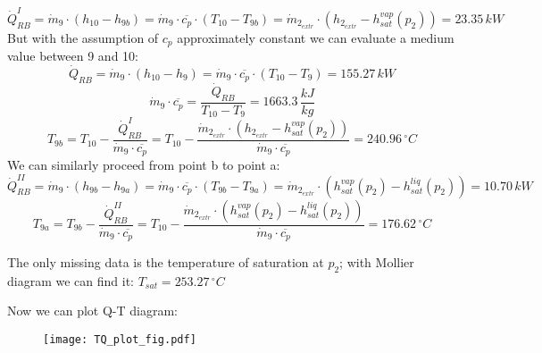 \documentclass[a4paper,12pt]{article}
\newcommand{\celsius}[0]{\,^{\circ}C}
\newcommand{\kjkg}[0]{\,\frac{kJ}{kg}}
\newcommand{\kw}[0]{\,kW}
\newcommand{\md}[0]{Mollier diagram }
\begin{document}
\begin{equation}
\dot{Q}_{RB}^{I} = \dot{m}_9 \cdot (h_{10}-h_{9b})
= \dot{m}_9 \cdot \overline{c_p} \cdot (T_{10}-T_{9b})
= \dot{m}_{2_{extr}} \cdot (h_{2_{extr}} - h^{vap}_{sat}(p_2))
= 23.35 \kw
\end{equation}
But with the assumption of $c_p$ approximately constant we can evaluate a medium value between 9 and 10:
\begin{equation}
\dot{Q}_{RB} = \dot{m}_9 \cdot (h_{10}-h_{9})
= \dot{m}_9 \cdot \overline{c_p} \cdot (T_{10}-T_{9}) = 155.27 \kw
\end{equation}
\begin{equation}
\dot{m}_9 \cdot \overline{c_p} = \frac{\dot{Q}_{RB}}{T_{10}-T_{9}} = 1663.3 \kjkg 
\end{equation}
\begin{equation}
T_{9b} = T_{10} - \frac{\dot{Q}_{RB}^{I}}{\dot{m}_9 \cdot \overline{c_p}}
= T_{10} - \frac{\dot{m}_{2_{extr}} \cdot (h_{2_{extr}} - h^{vap}_{sat}(p_2)) }{\dot{m}_9 \cdot \overline{c_p}} =  240.96 \celsius
\end{equation}
We can similarly proceed from point b to point a:
\begin{equation}
\dot{Q}_{RB}^{II} = \dot{m}_9 \cdot (h_{9b}-h_{9a})
= \dot{m}_9 \cdot \overline{c_p} \cdot (T_{9b}-T_{9a})
= \dot{m}_{2_{extr}} \cdot (h^{vap}_{sat}(p_2) - h^{liq}_{sat}(p_2))
= 10.70 \kw
\end{equation}
\begin{equation}
T_{9a} = T_{9b} - \frac{\dot{Q}_{RB}^{II}}{\dot{m}_9 \cdot \overline{c_p}}
= T_{10} - \frac{\dot{m}_{2_{extr}} \cdot (h^{vap}_{sat}(p_2) - h^{liq}_{sat}(p_2)) }{\dot{m}_9 \cdot \overline{c_p}} =   176.62 \celsius
\end{equation}

The only missing data is the temperature of saturation at $p_2$; with \md we can find it: $T_{sat} = 253.27 \celsius$

Now we can plot Q-T diagram:

\begin{figure}[h]
\centering
    \texttt{[image: TQ\_plot\_fig.pdf]}
\end{figure}
\end{document}
